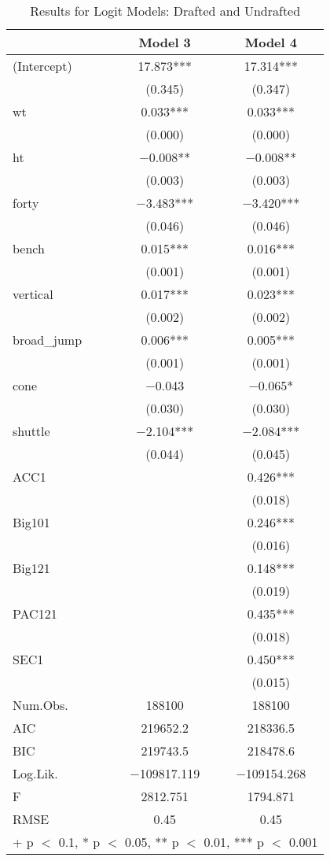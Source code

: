 \documentclass[12pt,english]{article}
\begin{document}
\begin{table}
\caption{Results for Logit Models: Drafted and Undrafted}
\centering
\begin{tabular}[t]{lcc}
\toprule
  & Model 3 & Model 4\\
\midrule
(Intercept) & \num{17.873}*** & \num{17.314}***\\
 & (\num{0.345}) & (\num{0.347})\\
wt & \num{0.033}*** & \num{0.033}***\\
 & (\num{0.000}) & (\num{0.000})\\
ht & \num{-0.008}** & \num{-0.008}**\\
 & (\num{0.003}) & (\num{0.003})\\
forty & \num{-3.483}*** & \num{-3.420}***\\
 & (\num{0.046}) & (\num{0.046})\\
bench & \num{0.015}*** & \num{0.016}***\\
 & (\num{0.001}) & \vphantom{1} (\num{0.001})\\
vertical & \num{0.017}*** & \num{0.023}***\\
 & (\num{0.002}) & (\num{0.002})\\
broad\_jump & \num{0.006}*** & \num{0.005}***\\
 & (\num{0.001}) & (\num{0.001})\\
cone & \num{-0.043} & \num{-0.065}*\\
 & (\num{0.030}) & (\num{0.030})\\
shuttle & \num{-2.104}*** & \num{-2.084}***\\
 & (\num{0.044}) & (\num{0.045})\\
ACC1 &  & \num{0.426}***\\
 &  & \vphantom{1} (\num{0.018})\\
Big101 &  & \num{0.246}***\\
 &  & (\num{0.016})\\
Big121 &  & \num{0.148}***\\
 &  & (\num{0.019})\\
PAC121 &  & \num{0.435}***\\
 &  & (\num{0.018})\\
SEC1 &  & \num{0.450}***\\
 &  & (\num{0.015})\\
\midrule
Num.Obs. & \num{188100} & \num{188100}\\
AIC & \num{219652.2} & \num{218336.5}\\
BIC & \num{219743.5} & \num{218478.6}\\
Log.Lik. & \num{-109817.119} & \num{-109154.268}\\
F & \num{2812.751} & \num{1794.871}\\
RMSE & \num{0.45} & \num{0.45}\\
\bottomrule
\multicolumn{3}{l}{\rule{0pt}{1em}+ p $<$ 0.1, * p $<$ 0.05, ** p $<$ 0.01, *** p $<$ 0.001}\\
\end{tabular}
\end{table}
\end{document}
